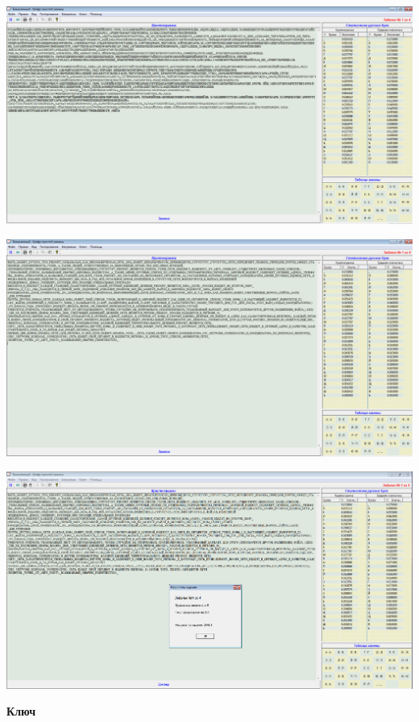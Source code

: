 \documentclass[a4paper,14pt]{extarticle}
\begin{document}
    \begin{center}
        \includegraphics[scale=0.3]{pics/1.png}
    \end{center}
    \begin{center}
        \includegraphics[scale=0.3]{pics/1_1.png}
    \end{center}
    \begin{center}
        \includegraphics[scale=0.3]{pics/1_2.png}
    \end{center}
    \begin{center}
        \textbf{Ключ}
    \end{center}
\end{document}
